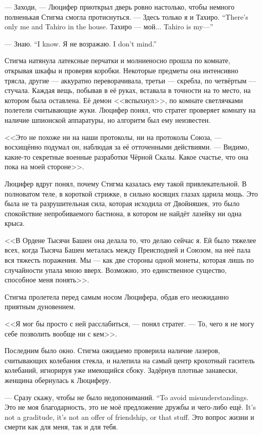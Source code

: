 --- Заходи, --- Люцифер приоткрыл дверь ровно настолько, чтобы немного полненькая Стигма смогла протиснуться.
{--- Здесь только я и Тахиро.}
{``There's only me and Tahiro in the house.}
{Тахиро --- мой...}
{Tahiro is my---''}

{--- Знаю.}
{``I know.}
{Я не возражаю.}
{I don't mind.''}

Стигма натянула латексные перчатки и молниеносно прошла по комнате, открывая шкафы и проверяя коробки.
Некоторые предметы она интенсивно трясла, другие --- аккуратно переворачивала, третьи --- скребла, по четвёртым --- стучала.
Каждая вещь, побывав в её руках, вставала в точности на то место, на котором была оставлена.
Её демон <<вспыхнул>>, по комнате светлячками полетели считывающие жуки.
Люцифер понял, что стратег проверяет комнату на наличие шпионской аппаратуры, но алгоритм был ему неизвестен.

<<Это не похоже ни на наши протоколы, ни на протоколы Союза, --- восхищённо подумал он, наблюдая за её отточенными действиями.
--- Видимо, какие-то секретные военные разработки Чёрной Скалы.
Какое счастье, что она пока на моей стороне>>.

Люцифер вдруг понял, почему Стигма казалась ему такой привлекательной.
В полноватом теле, в короткой стрижке, в сильно косящих глазах царила мощь.
Это была не та разрушительная сила, которая исходила от Двойняшек, это было спокойствие непробиваемого бастиона, в котором не найдёт лазейку ни одна крыса.

<<В Ордене Тысячи Башен она делала то, что делаю сейчас я.
Ей было тяжелее всех, когда Тысяча Башен металась между Преисподней и Союзом, на неё пала вся тяжесть поражения.
Мы --- как две стороны одной монеты, которая лишь по случайности упала мною вверх.
Возможно, это единственное существо, способное меня понять>>.

Стигма пролетела перед самым носом Люцифера, обдав его неожиданно приятным дуновением.

<<Я мог бы просто с ней расслабиться, --- понял стратег.
--- То, чего я не могу себе позволить вообще ни с кем>>.

Последним было окно.
Стигма ожидаемо проверила наличие лазеров, считывающих колебания стекла, и налепила на самый центр крохотный гаситель колебаний, игнорируя уже имеющийся сбоку.
Задёрнув плотные занавески, женщина обернулась к Люциферу.

{--- Сразу скажу, чтобы не было недопониманий.}
{``To avoid misunderstandings.}
{Это не моя благодарность, это не моё предложение дружбы и чего-либо ещё.}
{It's not a graditude, it's not an offer of friendship, or that stuff.}
Это вопрос жизни и смерти как для меня, так и для тебя.

